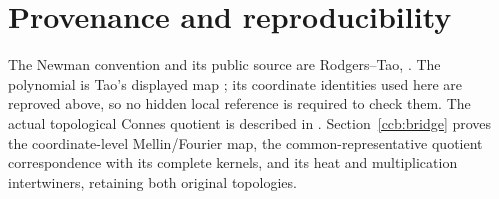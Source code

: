 \documentclass[11pt,a4paper]{article}
\theoremstyle{definition}
\theoremstyle{plain}
\begin{document}
\tableofcontents












\section{Provenance and reproducibility}
The Newman convention and its public source are Rodgers--Tao,
\cite[Section 1, equations (1)--(4)]{rodgersTao2020}.
The polynomial is Tao's displayed map
\cite[equation (1)]{tao2026jacobian}; its coordinate identities used here are
reproved above, so no hidden local reference is required to check them.
The actual topological Connes quotient is described in
\cite[Section 3.6, Proposition 3.6]{ccmProlate2024}.
Section~\ref{ccb:bridge} proves the coordinate-level Mellin/Fourier map,
the common-representative quotient correspondence with its complete
kernels, and its heat and multiplication intertwiners, retaining both
original topologies.
\end{document}

